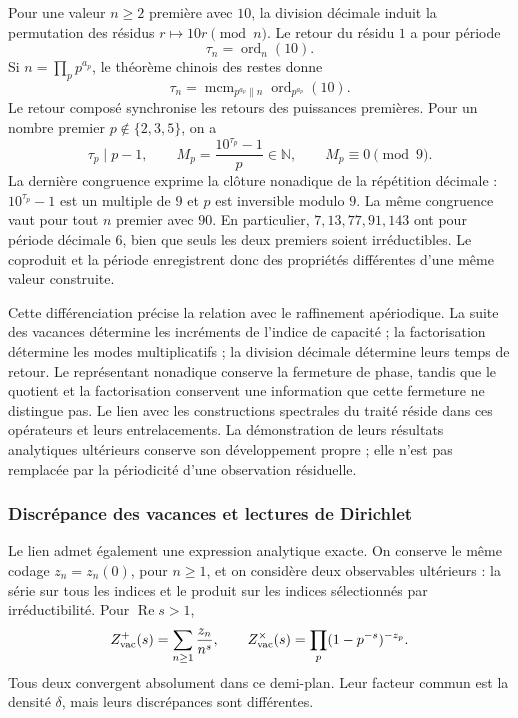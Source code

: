 Pour une valeur \(n\geq2\) première avec \(10\), la division décimale induit la
permutation des résidus \(r\mapsto10r\pmod n\). Le retour du résidu
\(1\) a pour période
\[
 \tau_n=\operatorname{ord}_n(10).
\]
Si \(n=\prod_p p^{a_p}\), le théorème chinois des restes donne
\[
 \tau_n=\operatorname{mcm}_{p^{a_p}\parallel n}
                    \operatorname{ord}_{p^{a_p}}(10).
\]
Le retour composé synchronise les retours des puissances premières.
Pour un nombre premier \(p\notin\{2,3,5\}\), on a
\[
 \tau_p\mid p-1,\qquad
 M_p=\frac{10^{\tau_p}-1}{p}\in\mathbb N,
 \qquad M_p\equiv0\pmod9.
\]
La dernière congruence exprime la clôture nonadique de la répétition décimale : \(10^{\tau_p}-1\) est un multiple de \(9\) et \(p\) est inversible modulo \(9\). La même congruence vaut pour tout \(n\) premier avec \(90\). En particulier, \(7,13,77,91,143\) ont pour période décimale \(6\), bien que seuls les deux premiers soient irréductibles. Le coproduit et la période enregistrent donc des propriétés différentes d'une même valeur construite.

Cette différenciation précise la relation avec le raffinement apériodique.
La suite des vacances détermine les incréments de l'indice de
capacité ; la factorisation détermine les modes multiplicatifs ; la
division décimale détermine leurs temps de retour. Le représentant
nonadique conserve la fermeture de phase, tandis que le quotient et la
factorisation conservent une information que cette fermeture ne distingue pas. Le
lien avec les constructions spectrales du traité réside dans ces
opérateurs et leurs entrelacements. La démonstration de leurs résultats
analytiques ultérieurs conserve son développement propre ; elle n'est pas remplacée par
la périodicité d'une observation résiduelle.

\subsubsection{Discrépance des vacances et lectures de Dirichlet}

Le lien admet également une expression analytique exacte. On conserve le
même codage \(z_n=z_n(0)\), pour \(n\geq1\), et on considère
deux observables ultérieurs : la série sur tous les indices et le
produit sur les indices sélectionnés par irréductibilité. Pour
\(\operatorname{Re}s>1\),
\[
 Z_{\rm vac}^{+}(s)=\sum_{n\geq1}\frac{z_n}{n^s},\qquad
 Z_{\rm vac}^{\times}(s)=\prod_p(1-p^{-s})^{-z_p}.
\]
Tous deux convergent absolument dans ce demi-plan. Leur facteur commun est la
densité \(\delta\), mais leurs discrépances sont différentes.


